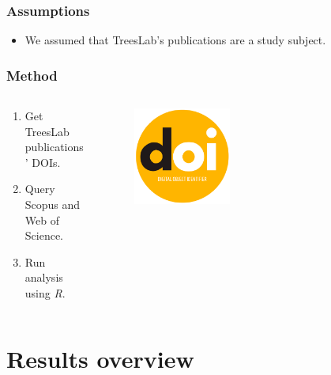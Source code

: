 \documentclass[aspectratio=169]{beamer}
\begin{document}

\begin{frame}
	\frametitle{Assumptions}
	\begin{itemize}
		\item We assumed that TreesLab's publications are a study subject.
	\end{itemize}
\end{frame}

\begin{frame}
	\frametitle{Method}
	\begin{columns}
		\begin{column}{0.5\textwidth}
			\begin{enumerate}
				\item Get TreesLab publications' DOIs.
				\item Query Scopus and Web of Science.
                \item Run analysis using \textit{R}.
			\end{enumerate}
		\end{column}
		\begin{column}{0.5\textwidth}
			\begin{figure}
				\centering
				\includegraphics[width=0.4\textwidth]{logos/logo_doi.png}
			\end{figure}
		\end{column}
	\end{columns}
\end{frame}



\section{Results overview}
\end{document}

